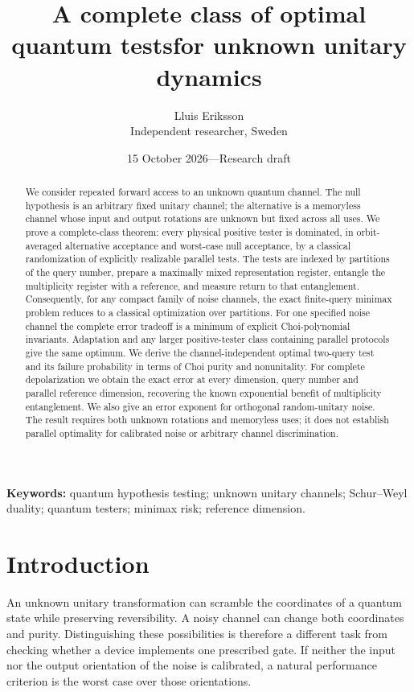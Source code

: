 \documentclass[11pt,a4paper]{article}
\title{A complete class of optimal quantum tests\newline for unknown unitary dynamics}
\author{Lluis Eriksson\\\small Independent researcher, Sweden}
\date{15 October 2026\quad---\quad Research draft}
\theoremstyle{remark}\newtheorem{remark}[theorem]{Remark}
\begin{document}
\maketitle
\begin{abstract}
We consider repeated forward access to an unknown quantum channel. The null hypothesis is an arbitrary fixed unitary channel; the alternative is a memoryless channel whose input and output rotations are unknown but fixed across all uses. We prove a complete-class theorem: every physical positive tester is dominated, in orbit-averaged alternative acceptance and worst-case null acceptance, by a classical randomization of explicitly realizable parallel tests. The tests are indexed by partitions of the query number, prepare a maximally mixed representation register, entangle the multiplicity register with a reference, and measure return to that entanglement. Consequently, for any compact family of noise channels, the exact finite-query minimax problem reduces to a classical optimization over partitions. For one specified noise channel the complete error tradeoff is a minimum of explicit Choi-polynomial invariants. Adaptation and any larger positive-tester class containing parallel protocols give the same optimum. We derive the channel-independent optimal two-query test and its failure probability in terms of Choi purity and nonunitality. For complete depolarization we obtain the exact error at every dimension, query number and parallel reference dimension, recovering the known exponential benefit of multiplicity entanglement. We also give an error exponent for orthogonal random-unitary noise. The result requires both unknown rotations and memoryless uses; it does not establish parallel optimality for calibrated noise or arbitrary channel discrimination.
\end{abstract}
\noindent\textbf{Keywords:} quantum hypothesis testing; unknown unitary channels; Schur--Weyl duality; quantum testers; minimax risk; reference dimension.

\section{Introduction}
An unknown unitary transformation can scramble the coordinates of a quantum state while preserving reversibility. A noisy channel can change both coordinates and purity. Distinguishing these possibilities is therefore a different task from checking whether a device implements one prescribed gate. If neither the input nor the output orientation of the noise is calibrated, a natural performance criterion is the worst case over those orientations.
\end{document}
